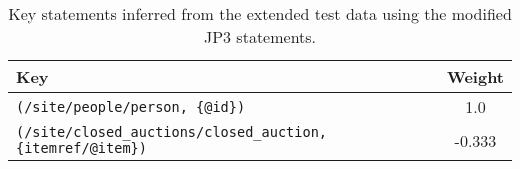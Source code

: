 \begin{table}
\label{TAB_inferred_keys_3}
\caption{Key statements inferred from the extended test data using the modified JP3 statements.}
\begin{tabular}{|l|c|}
\hline
\textbf{Key} & \textbf{Weight} \\ \hline \hline
\texttt{(/site/people/person, \{@id\})} & 1.0 \\ \hline
\texttt{(/site/closed\_auctions/closed\_auction, \{itemref/@item\})} & -0.333 \\ \hline
\end{tabular}
\end{table}

